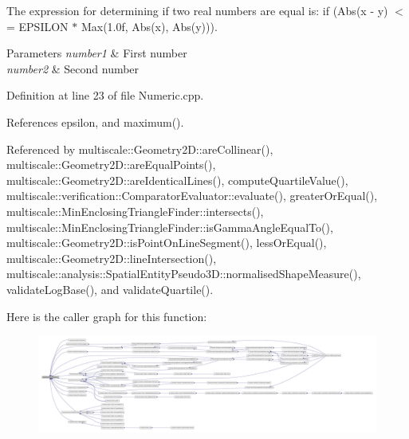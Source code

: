 \-The expression for determining if two real numbers are equal is\-: if (\-Abs(x -\/ y) $<$= \-E\-P\-S\-I\-L\-O\-N $\ast$ \-Max(1.\-0f, \-Abs(x), \-Abs(y))).


\begin{DoxyParams}{\-Parameters}
{\em number1} & \-First number \\
\hline
{\em number2} & \-Second number \\
\hline
\end{DoxyParams}


\-Definition at line 23 of file \-Numeric.\-cpp.



\-References epsilon, and maximum().



\-Referenced by multiscale\-::\-Geometry2\-D\-::are\-Collinear(), multiscale\-::\-Geometry2\-D\-::are\-Equal\-Points(), multiscale\-::\-Geometry2\-D\-::are\-Identical\-Lines(), compute\-Quartile\-Value(), multiscale\-::verification\-::\-Comparator\-Evaluator\-::evaluate(), greater\-Or\-Equal(), multiscale\-::\-Min\-Enclosing\-Triangle\-Finder\-::intersects(), multiscale\-::\-Min\-Enclosing\-Triangle\-Finder\-::is\-Gamma\-Angle\-Equal\-To(), multiscale\-::\-Geometry2\-D\-::is\-Point\-On\-Line\-Segment(), less\-Or\-Equal(), multiscale\-::\-Geometry2\-D\-::line\-Intersection(), multiscale\-::analysis\-::\-Spatial\-Entity\-Pseudo3\-D\-::normalised\-Shape\-Measure(), validate\-Log\-Base(), and validate\-Quartile().



\-Here is the caller graph for this function\-:
\nopagebreak
\begin{figure}[H]
\begin{center}
\leavevmode
\includegraphics[width=350pt]{classmultiscale_1_1Numeric_a996dda9f7361be59b4614eace0b93f24_icgraph}
\end{center}
\end{figure}



